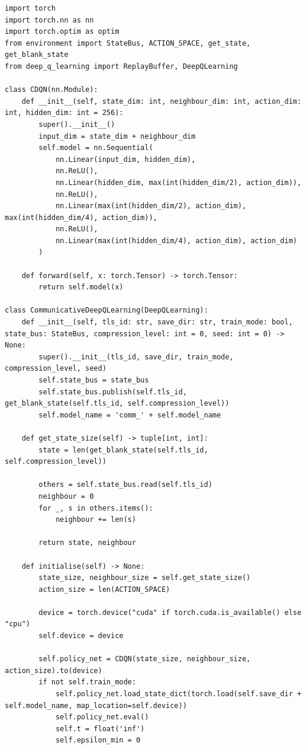\documentclass[a4paper]{report}
\begin{document}
\begin{lstlisting}[style=pythonstyle]
import torch
import torch.nn as nn
import torch.optim as optim
from environment import StateBus, ACTION_SPACE, get_state, get_blank_state
from deep_q_learning import ReplayBuffer, DeepQLearning

class CDQN(nn.Module):
    def __init__(self, state_dim: int, neighbour_dim: int, action_dim: int, hidden_dim: int = 256):
        super().__init__()
        input_dim = state_dim + neighbour_dim
        self.model = nn.Sequential(
            nn.Linear(input_dim, hidden_dim),
            nn.ReLU(),
            nn.Linear(hidden_dim, max(int(hidden_dim/2), action_dim)),
            nn.ReLU(),
            nn.Linear(max(int(hidden_dim/2), action_dim), max(int(hidden_dim/4), action_dim)),
            nn.ReLU(),
            nn.Linear(max(int(hidden_dim/4), action_dim), action_dim)
        )

    def forward(self, x: torch.Tensor) -> torch.Tensor:
        return self.model(x)

class CommunicativeDeepQLearning(DeepQLearning):
    def __init__(self, tls_id: str, save_dir: str, train_mode: bool, state_bus: StateBus, compression_level: int = 0, seed: int = 0) -> None:
        super().__init__(tls_id, save_dir, train_mode, compression_level, seed)
        self.state_bus = state_bus
        self.state_bus.publish(self.tls_id, get_blank_state(self.tls_id, self.compression_level))
        self.model_name = 'comm_' + self.model_name

    def get_state_size(self) -> tuple[int, int]:
        state = len(get_blank_state(self.tls_id, self.compression_level))

        others = self.state_bus.read(self.tls_id)
        neighbour = 0
        for _, s in others.items():
            neighbour += len(s)

        return state, neighbour

    def initialise(self) -> None:
        state_size, neighbour_size = self.get_state_size()
        action_size = len(ACTION_SPACE)

        device = torch.device("cuda" if torch.cuda.is_available() else "cpu")
        self.device = device

        self.policy_net = CDQN(state_size, neighbour_size, action_size).to(device)
        if not self.train_mode:
            self.policy_net.load_state_dict(torch.load(self.save_dir + self.model_name, map_location=self.device))
            self.policy_net.eval()
            self.t = float('inf')
            self.epsilon_min = 0


\end{lstlisting}
\end{document}
